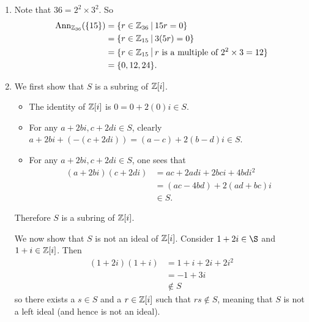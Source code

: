 \begin{enumerate}
    \item Note that $36 = 2^2 \times 3^2$. So
    \begin{align*}
        \Ann{\Zn{36}}{\{15\}} &= \{r \in \Zn{36} \vert 15r = 0\}\\
        &= \{r \in \Zn{15} \vert 3(5r) = 0\}\\
        &= \{r \in \Zn{15} \vert r \text{ is a multiple of }2^2\times3 = 12\}\\
        &= \{0,12,24\}.
    \end{align*}

    \item We first show that $S$ is a subring of $\mathbb{Z}[i]$.
    \begin{itemize}
        \item The identity of $\mathbb{Z}[i]$ is $0 = 0 + 2(0)i \in S$.
        \item For any $a+2bi, c+2di \in S$, clearly $a+2bi + (-(c + 2di)) = (a-c) + 2(b-d)i \in S$.
        \item For any $a+2bi, c+2di \in S$, one sees that
        \begin{align*}
            (a+2bi)(c+2di) &= ac + 2adi + 2bci + 4bdi^2\\
            &= (ac-4bd) + 2(ad+bc)i\\
            &\in S.
        \end{align*}
    \end{itemize}
    Therefore $S$ is a subring of $\mathbb{Z}[i]$.

    We now show that $S$ is not an ideal of $\mathbb{Z}[i]$. Consider $1+2i \in \S$ and $1+i \in \mathbb{Z}[i]$. Then
    \begin{align*}
        (1+2i)(1+i) &= 1+i+2i+2i^2\\
        &= -1 + 3i\\
        &\notin S
    \end{align*}
    so there exists a $s \in S$ and a $r \in \mathbb{Z}[i]$ such that $rs\notin S$, meaning that $S$ is not a left ideal (and hence is not an ideal).


\end{enumerate}
